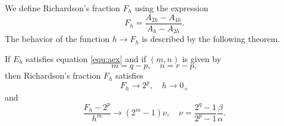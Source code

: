 \documentclass[runningheads]{llncs}
\begin{document}
We define Richardson's fraction $F_h$ using the expression
\begin{equation}
  F_h = \frac{A_{2h} - A_{4h}}{A_h - A_{2h}}.
\end{equation}
The behavior of the function $h \rightarrow F_h$ is described by the following theorem.
\begin{theorem} If $E_h$ satisfies equation \eqref{equ:aex} and if $(m,n)$ is given by
  \begin{equation}
    m = q - p, \quad n = r - p,
  \end{equation}
  then Richardson's fraction $F_h$ satisfies
  \begin{equation}
    F_h \rightarrow 2^p, \quad h \rightarrow 0_+
  \end{equation}
  and 
  \begin{equation}
    \frac{F_h - 2^p}{h^m} \rightarrow (2^m-1) \nu, \quad \nu = \frac{2^q-1}{2^p-1} \frac{\beta}{\alpha}.
    \end{equation}
\end{theorem}
\end{document}
